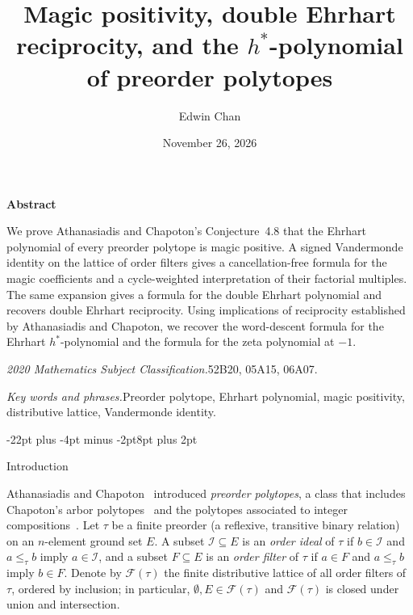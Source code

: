\documentclass[11pt,letterpaper]{article}
\makeatletter
\renewcommand{\section}{\@startsection{section}{1}{\z@}%
  {-22pt plus -4pt minus -2pt}{8pt plus 2pt}%
  {\normalfont\fontsize{14}{17}\selectfont\bfseries\raggedright}}
\renewenvironment{abstract}{%
  \par\noindent\textbf{Abstract}\par\nobreak\vskip4pt
  \noindent\ignorespaces
}{\par}
\theoremstyle{result}
\theoremstyle{definition}
\theoremstyle{remark}
\newcommand{\fF}{\mathcal{F}}
\newcommand{\iI}{\mathcal{I}}
\makeatother
\begin{document}
\title{Magic positivity, double Ehrhart reciprocity, and the \texorpdfstring{$h^*$}{h*}-polynomial of preorder polytopes}
\author{Edwin Chan}
\date{November 26, 2026}

\maketitle

\begin{abstract}
We prove Athanasiadis and Chapoton's Conjecture~4.8 that the Ehrhart polynomial of every preorder polytope is magic positive. A signed Vandermonde identity on the lattice of order filters gives a cancellation-free formula for the magic coefficients and a cycle-weighted interpretation of their factorial multiples. The same expansion gives a formula for the double Ehrhart polynomial and recovers double Ehrhart reciprocity. Using implications of reciprocity established by Athanasiadis and Chapoton, we recover the word-descent formula for the Ehrhart $h^*$-polynomial and the formula for the zeta polynomial at $-1$.
\end{abstract}

\smallskip
{\small\noindent\textit{2020 Mathematics Subject Classification.}\enspace 52B20, 05A15, 06A07.
\par\noindent\textit{Key words and phrases.}\enspace Preorder polytope, Ehrhart polynomial, magic positivity, distributive lattice, Vandermonde identity.\par}

\section{Introduction}
\label{sec:intro}

Athanasiadis and Chapoton~\cite{AC26} introduced \emph{preorder polytopes}, a class that includes Chapoton's arbor polytopes~\cite{Cha25} and the polytopes associated to integer compositions~\cite{Ath26}. Let $\tau$ be a finite preorder (a reflexive, transitive binary relation) on an $n$-element ground set $E$. A subset $\iI\subseteq E$ is an \emph{order ideal} of $\tau$ if $b\in\iI$ and $a\le_\tau b$ imply $a\in\iI$, and a subset $F\subseteq E$ is an \emph{order filter} of $\tau$ if $a\in F$ and $a\le_\tau b$ imply $b\in F$. Denote by $\fF(\tau)$ the finite distributive lattice of all order filters of $\tau$, ordered by inclusion; in particular, $\emptyset, E\in\fF(\tau)$ and $\fF(\tau)$ is closed under union and intersection.
\end{document}
